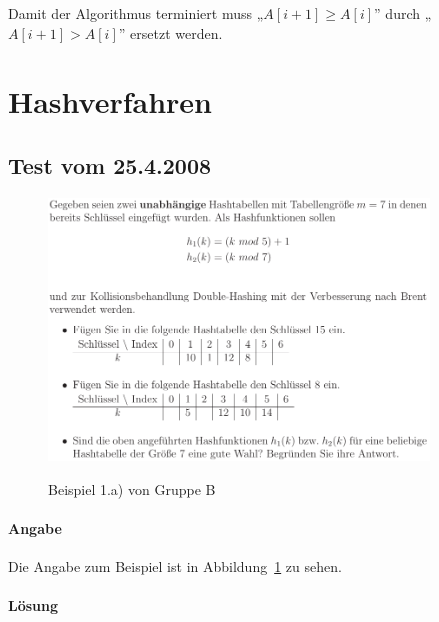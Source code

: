 \documentclass[a4paper, 12pt]{article}
\begin{document}
Damit der Algorithmus terminiert muss „$A[i+1] ≥ A[i]$” durch „$A[i+1] >
A[i]$” ersetzt werden.

\section{Hashverfahren}

\subsection{Test vom 25.4.2008}

\begin{figure}[htbp]
	\caption{Beispiel 1.a) von Gruppe B}
	\vskip 0.2cm
	\centering
	\includegraphics[width=0.9\textwidth]{Figures/Test_2010-01-14_1Ba}
	\label{figure:Test_2010-01-14_1Ba}
\end{figure}

\paragraph{Angabe}

Die Angabe zum Beispiel ist in Abbildung~\ref{figure:Test_2010-01-14_1Ba} zu
sehen.

\paragraph{Lösung}
\end{document}
